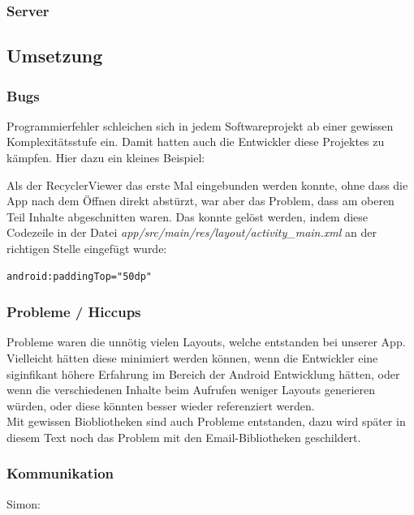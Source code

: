 \documentclass[a4paper,11pt]{article}
\begin{document}
\subsubsection{Server}

\subsection{Umsetzung}
\subsubsection{Bugs}
Programmierfehler schleichen sich in jedem Softwareprojekt ab einer gewissen Komplexitätsstufe ein. Damit hatten auch die Entwickler diese Projektes zu kämpfen. Hier dazu ein kleines Beispiel:

Als der RecyclerViewer das erste Mal eingebunden werden konnte, ohne dass die App nach dem Öffnen direkt abstürzt, war aber das Problem, dass am oberen Teil Inhalte abgeschnitten waren. Das konnte gelöst werden, indem diese Codezeile in der Datei \textit{app/src/main/res/layout/activity\_main.xml} an der richtigen Stelle eingefügt wurde:

\lstset{language=XML}
\begin{lstlisting}
android:paddingTop="50dp"
\end{lstlisting}

\subsubsection{Probleme / Hiccups}
Probleme waren die unnötig vielen Layouts, welche entstanden bei unserer App. Vielleicht hätten diese minimiert werden können, wenn die Entwickler eine siginfikant höhere Erfahrung im Bereich der Android Entwicklung hätten, oder wenn die verschiedenen Inhalte beim Aufrufen weniger Layouts generieren würden, oder diese könnten besser wieder referenziert werden.\\

Mit gewissen Biobliotheken sind auch Probleme entstanden, dazu wird später in diesem Text noch das Problem mit den Email-Bibliotheken geschildert.

\subsubsection{Kommunikation}
Simon:
\end{document}
